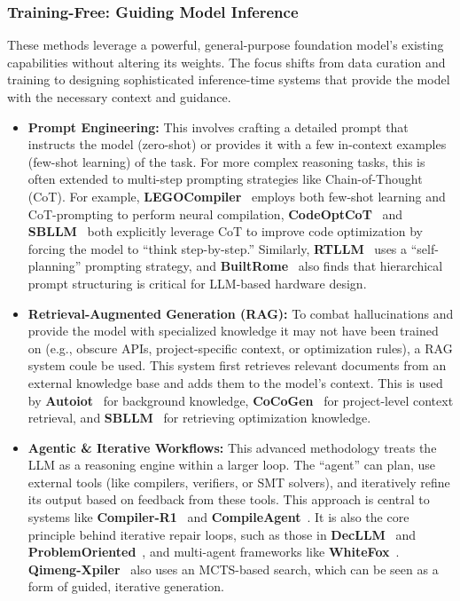 \documentclass[pdflatex,sn-mathphys-ay,twocolumn, a4paper]{sn-jnl}%
\theoremstyle{thmstyleone}%
\theoremstyle{thmstyletwo}%
\theoremstyle{thmstylethree}%
\begin{document}
\subsubsection{Training-Free: Guiding Model Inference}
These methods leverage a powerful, general-purpose foundation model's existing capabilities without altering its weights. The focus shifts from data curation and training to designing sophisticated inference-time systems that provide the model with the necessary context and guidance.
\begin{itemize}
    \item \textbf{Prompt Engineering:} 
    This involves crafting a detailed prompt that instructs the model (zero-shot) or provides it with a few in-context examples (few-shot learning) of the task. For more complex reasoning tasks, this is often extended to multi-step prompting strategies like Chain-of-Thought (CoT). For example, \textbf{LEGOCompiler}~\citep{5_legocompiler-arxiv25} employs both few-shot learning and CoT-prompting to perform neural compilation, \textbf{CodeOptCoT}~\citep{116_xu2024code} and \textbf{SBLLM}~\citep{17_gao2025search} both explicitly leverage CoT to improve code optimization by forcing the model to ``think step-by-step.'' Similarly, \textbf{RTLLM}~\citep{114_lu2024rtllm} uses a ``self-planning'' prompting strategy, and \textbf{BuiltRome}~\citep{120_nakkab2024rome} also finds that hierarchical prompt structuring is critical for LLM-based hardware design.

    \item \textbf{Retrieval-Augmented Generation (RAG):} 
    To combat hallucinations and provide the model with specialized knowledge it may not have been trained on (e.g., obscure APIs, project-specific context, or optimization rules), a RAG system coule be used. This system first retrieves relevant documents from an external knowledge base and adds them to the model's context. This is used by \textbf{Autoiot}~\citep{59_autoiot2025_mobicom} for background knowledge, \textbf{CoCoGen}~\citep{110_bi-etal-2024-iterative} for project-level context retrieval, and \textbf{SBLLM}~\citep{17_gao2025search} for retrieving optimization knowledge.

    \item \textbf{Agentic \& Iterative Workflows:} 
    This advanced methodology treats the LLM as a reasoning engine within a larger loop. The ``agent'' can plan, use external tools (like compilers, verifiers, or SMT solvers), and iteratively refine its output based on feedback from these tools. This approach is central to systems like \textbf{Compiler-R1}~\citep{45_compilerr1-2025_arxiv} and \textbf{CompileAgent}~\citep{8_hu2025compileagent_acl}. It is also the core principle behind iterative repair loops, such as those in \textbf{DecLLM}~\citep{173_wong2025decllm} and \textbf{ProblemOriented}~\citep{123_ye2024problem}, and multi-agent frameworks like \textbf{WhiteFox}~\citep{31_yang2024whitefox}. \textbf{Qimeng-Xpiler}~\citep{10_qimengxpiler2025_osdi} also uses an MCTS-based search, which can be seen as a form of guided, iterative generation.
\end{itemize}
\end{document}

